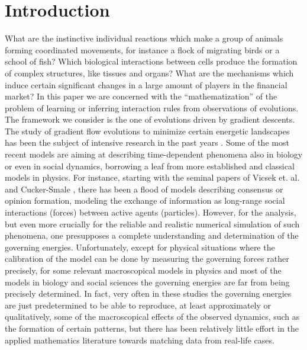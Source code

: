 \section{Introduction}

What are the instinctive individual reactions which make a group of animals forming coordinated movements, for instance a flock of migrating birds or a school of fish? Which biological interactions between cells produce the formation of complex structures, like tissues and organs? What are the mechanisms which induce certain significant changes in a large amount of players in the financial market? 
In this paper we are concerned with the ``mathematization'' of the problem of learning or inferring interaction rules from observations of evolutions. The framework we consider is the one of  evolutions driven by gradient descents.
The study of gradient flow evolutions to minimize  certain energetic landscapes has been the subject of intensive research in the past years \cite{AGS}. Some of the most recent models are  aiming at describing time-dependent phenomena also in biology or even in social dynamics, borrowing a leaf from more established and classical  models in physics. For instance, starting with the seminal papers of Vicsek et. al. \cite{VCBCS95} and Cucker-Smale \cite{CucSma07}, there has been a flood of models describing consensus or opinion formation,  modeling the exchange of information as long-range social interactions (forces) between active agents (particles). However, for the analysis, but even more crucially for the reliable and realistic numerical simulation of such phenomena, one presupposes a complete understanding and determination of the governing energies. Unfortunately, except for physical situations where the calibration of the model can be done by measuring the governing forces rather precisely, for some relevant macroscopical models in physics and most of the models in biology and social sciences the governing energies are far from being precisely determined. In fact, very often in these studies the governing energies are just predetermined to be able to reproduce, at least approximately or qualitatively, some of the macroscopical effects of the observed dynamics, such as the formation of certain patterns, but there has been relatively little effort in the applied mathematics literature towards matching data from real-life cases. 

